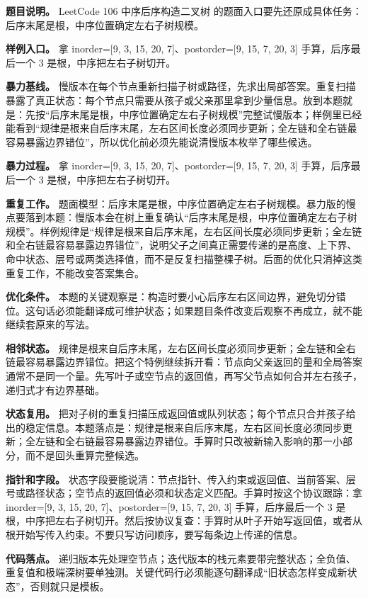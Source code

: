 \textbf{题目说明。} LeetCode 106 中序后序构造二叉树 的题面入口要先还原成具体任务：后序末尾是根，中序位置确定左右子树规模。

\textbf{样例入口。} 拿 inorder=[9, 3, 15, 20, 7]、postorder=[9, 15, 7, 20, 3] 手算，后序最后一个 3 是根，中序把左右子树切开。

\textbf{暴力基线。} 慢版本在每个节点重新扫描子树或路径，先求出局部答案。重复扫描暴露了真正状态：每个节点只需要从孩子或父亲那里拿到少量信息。放到本题就是：先按“后序末尾是根，中序位置确定左右子树规模”完整试慢版本；样例里已经能看到“规律是根来自后序末尾，左右区间长度必须同步更新；全左链和全右链最容易暴露边界错位”，所以优化前必须先能说清慢版本枚举了哪些候选。

\textbf{暴力过程。} 拿 inorder=[9, 3, 15, 20, 7]、postorder=[9, 15, 7, 20, 3] 手算，后序最后一个 3 是根，中序把左右子树切开。

\textbf{重复工作。} 题面模型：后序末尾是根，中序位置确定左右子树规模。暴力版的慢点要落到本题：慢版本会在树上重复确认“后序末尾是根，中序位置确定左右子树规模”。样例规律是“规律是根来自后序末尾，左右区间长度必须同步更新；全左链和全右链最容易暴露边界错位”，说明父子之间真正需要传递的是高度、上下界、命中状态、层号或两类选择值，而不是反复扫描整棵子树。后面的优化只消掉这类重复工作，不能改变答案集合。

\textbf{优化条件。} 本题的关键观察是：构造时要小心后序左右区间边界，避免切分错位。这句话必须能翻译成可维护状态；如果题目条件改变后观察不再成立，就不能继续套原来的写法。

\textbf{相邻状态。} 规律是根来自后序末尾，左右区间长度必须同步更新；全左链和全右链最容易暴露边界错位。把这个特例继续拆开看：节点向父亲返回的量和全局答案通常不是同一个量。先写叶子或空节点的返回值，再写父节点如何合并左右孩子，递归式才有边界基础。

\textbf{状态复用。} 把对子树的重复扫描压成返回值或队列状态；每个节点只合并孩子给出的稳定信息。本题落点是：规律是根来自后序末尾，左右区间长度必须同步更新；全左链和全右链最容易暴露边界错位。手算时只改被新输入影响的那一小部分，而不是回头重算完整候选。

\textbf{指针和字段。} 状态字段要能说清：节点指针、传入约束或返回值、当前答案、层号或路径状态；空节点的返回值必须和状态定义匹配。手算时按这个协议跟踪：拿 inorder=[9, 3, 15, 20, 7]、postorder=[9, 15, 7, 20, 3] 手算，后序最后一个 3 是根，中序把左右子树切开。然后按协议复查：手算时从叶子开始写返回值，或者从根开始写传入约束。不要只写访问顺序，要写每条边上传递的信息。

\textbf{代码落点。} 递归版本先处理空节点；迭代版本的栈元素要带完整状态；全负值、重复值和极端深树要单独测。关键代码行必须能逐句翻译成“旧状态怎样变成新状态”，否则就只是模板。

